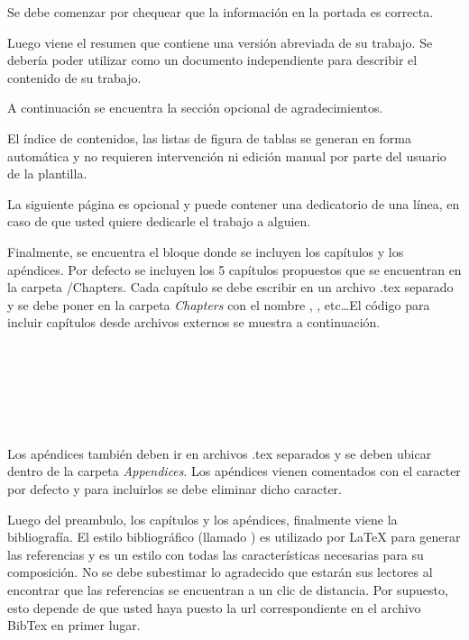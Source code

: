 Se debe comenzar por chequear que la información en la portada es correcta.

Luego viene el resumen que contiene una versión abreviada de su trabajo.  Se debería poder utilizar como un documento independiente para describir el contenido de su trabajo.

A continuación se encuentra la sección opcional de agradecimientos. 

El índice de contenidos, las listas de figura de tablas se generan en forma automática y no requieren intervención ni edición manual por parte del usuario de la plantilla. 

La siguiente página es opcional y puede contener una dedicatorio de una línea, en caso de que usted quiere dedicarle el trabajo a alguien.

Finalmente, se encuentra el bloque donde se incluyen los capítulos y los apéndices.  Por defecto se incluyen los 5 capítulos propuestos que se encuentran en la carpeta /Chapters. Cada capítulo se debe escribir en un archivo .tex separado y se debe poner en la carpeta \emph{Chapters} con el nombre , , etc\ldots El código para incluir capítulos desde archivos externos se muestra a continuación.

\begin{verbatim}
	
	 
	
	 
	 
\end{verbatim}

Los apéndices también deben ir en archivos .tex separados y se deben ubicar dentro de la carpeta \emph{Appendices}. Los apéndices vienen comentados con el caracter \code{\%} por defecto y para incluirlos se debe eliminar dicho caracter.

Luego del preambulo, los capítulos y los apéndices, finalmente viene la bibliografía. El estilo bibliográfico (llamado ) es utilizado por \LaTeX{} para generar las referencias y es un estilo con todas las características necesarias para su composición.  No se debe subestimar lo agradecido que estarán sus lectores al encontrar que las referencias se encuentran a un clic de distancia.  Por supuesto, esto depende de que usted haya puesto la url correspondiente en el archivo BibTex en primer lugar.







